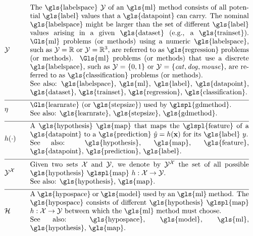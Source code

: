 \begin{align}
	&\labelspace  &\quad & \parbox{.90\textwidth}{The \gls{labelspace} $\labelspace$ of 
		an \gls{ml} method consists of all potential \gls{label} values that a \gls{datapoint} can 
		carry. The nominal \gls{labelspace} might be larger than the set of different \gls{label} 
		values arising in a given \gls{dataset} (e.g., a \gls{trainset}). \Gls{ml} problems 
		(or methods) using a numeric \gls{labelspace}, such as $\labelspace=\mathbb{R}$ 
		or $\labelspace=\mathbb{R}^{3}$, are referred to as \gls{regression} problems (or methods). \Gls{ml} 
		problems (or methods) that use a discrete \gls{labelspace}, such as $\labelspace=\{0,1\}$ or $\labelspace=\{\mbox{\emph{cat}},\mbox{\emph{dog}},\mbox{\emph{mouse}}\}$, 
		are referred to as \gls{classification} problems (or methods).
		\\ See also: \gls{labelspace}, \gls{ml}, \gls{label}, \gls{datapoint},  \gls{dataset}, \gls{trainset}, 
		\gls{regression}, \gls{classification}.}  \nonumber \\[2mm] \hline \nonumber\\[-5mm]
	&\lrate  &\quad & \parbox{.90\textwidth}{\Gls{learnrate} (or \gls{stepsize}) used by \glspl{gdmethod}.
		\\ See also: \gls{learnrate}, \gls{stepsize}, \gls{gdmethod}. }  \nonumber \\[2mm] \hline \nonumber\\[-5mm]
	&\hypothesis(\cdot)  &\quad &\parbox{.90\textwidth}{A \gls{hypothesis} \gls{map} that maps the \glspl{feature} of a \gls{datapoint} 
		to a \gls{prediction} $\hat{\truelabel}=\hypothesis(\featurevec)$ for its \gls{label} $\truelabel$.
		\\ See also: \gls{hypothesis}, \gls{map}, \gls{feature}, \gls{datapoint}, \gls{prediction}, \gls{label}. }  	 \nonumber \\[2mm] \hline \nonumber\\[-5mm]
	 &\labelspace^{\featurespace} &\quad & \parbox{.90\textwidth}{Given two sets $\featurespace$ and $\labelspace$, we denote by $\labelspace^{\featurespace}$ 
	 	the set of all possible \gls{hypothesis} \glspl{map} $\hypothesis: \featurespace \rightarrow \labelspace$.
		\\ See also: \gls{hypothesis}, \gls{map}. } 	 \nonumber \\[2mm] \hline \nonumber\\[-5mm]
	&\hypospace  &\quad & \parbox{.90\textwidth}{A \gls{hypospace} or \gls{model} used by an \gls{ml} method. 
		The \gls{hypospace} consists of different \gls{hypothesis} \glspl{map} $\hypothesis: \featurespace \rightarrow \labelspace$ between which 
		the \gls{ml} method must choose.
		\\ See also: \gls{hypospace}, \gls{model}, \gls{ml}, \gls{hypothesis}, \gls{map}. }   \nonumber 
\end{align}     

